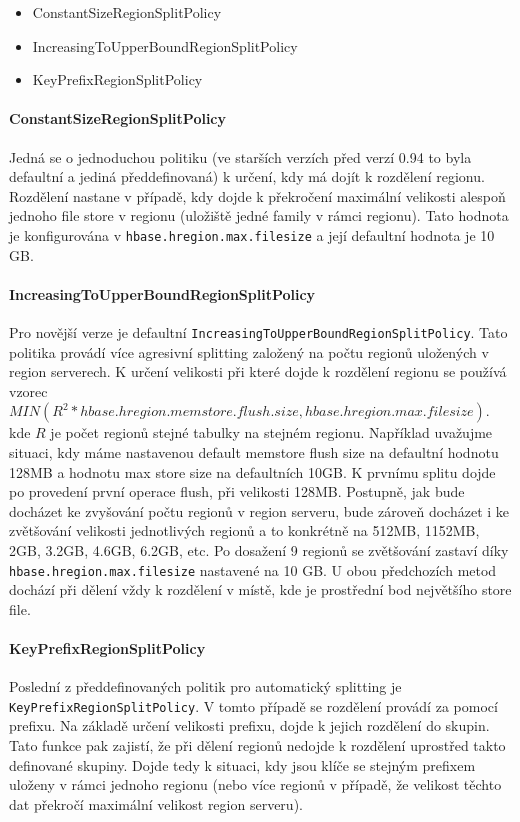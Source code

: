 \documentclass[thesis=M,czech]{FITthesis}[2012/06/26]
\begin{document}
\begin{itemize}
	\item ConstantSizeRegionSplitPolicy
	\item IncreasingToUpperBoundRegionSplitPolicy
	\item KeyPrefixRegionSplitPolicy
\end{itemize} 

\paragraph{ConstantSizeRegionSplitPolicy}
Jedná se o jednoduchou politiku (ve starších verzích před verzí 0.94 to byla defaultní a jediná předdefinovaná) k určení, kdy má dojít k rozdělení regionu. Rozdělení nastane v případě, kdy dojde k překročení maximální velikosti alespoň jednoho file store v regionu (uložiště jedné family v rámci regionu). Tato hodnota je konfigurována v \texttt{hbase.hregion.max.filesize} a její defaultní hodnota je 10 GB. 

\paragraph{IncreasingToUpperBoundRegionSplitPolicy}
Pro novější verze je defaultní \texttt{IncreasingToUpperBoundRegionSplitPolicy}. Tato politika provádí více agresivní splitting  založený na počtu regionů uložených v region serverech. K určení velikosti při které dojde k rozdělení regionu se používá vzorec $MIN(R^2 * hbase.hregion.memstore.flush.size,hbase.hregion.max.filesize)$.  kde $R$ je počet regionů stejné tabulky na stejném regionu. Například uvažujme situaci, kdy máme nastavenou default memstore flush size na defaultní hodnotu 128MB a hodnotu max store size na defaultních 10GB. K prvnímu splitu dojde po provedení první operace flush, při velikosti 128MB. Postupně, jak bude docházet ke zvyšování počtu regionů v region serveru, bude zároveň docházet i ke zvětšování velikosti jednotlivých regionů a to konkrétně na 512MB, 1152MB, 2GB, 3.2GB, 4.6GB, 6.2GB, etc. Po dosažení 9 regionů se zvětšování zastaví díky \texttt{hbase.hregion.max.filesize} nastavené na 10 GB. U obou předchozích metod dochází při dělení vždy k rozdělení v místě, kde je prostřední bod největšího store file.


\paragraph{KeyPrefixRegionSplitPolicy}
Poslední z předdefinovaných politik pro automatický splitting je \texttt{KeyPrefixRegionSplitPolicy}. V tomto případě se rozdělení provádí za pomocí prefixu. Na základě určení velikosti prefixu, dojde k jejich rozdělení do skupin. Tato funkce pak zajistí, že při dělení regionů nedojde k rozdělení uprostřed takto definované skupiny. Dojde tedy k situaci, kdy jsou klíče se stejným prefixem uloženy v rámci jednoho regionu (nebo více regionů v případě, že velikost těchto dat překročí maximální velikost region serveru).
\end{document}
